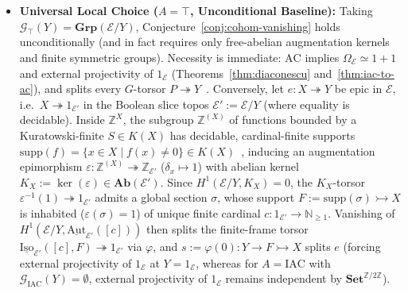 \documentclass[10pt,twoside,openright]{book}
\theoremstyle{crmplain}
\theoremstyle{crmdef}
\theoremstyle{crmremark}
\begin{document}
\begin{itemize}[leftmargin=1.5em]

  \item \textbf{Universal Local Choice ($A = \top$, Unconditional Baseline):} Taking $\mathcal{G}_\top(Y) = \mathbf{Grp}(\mathcal{E}/Y)$, Conjecture~\ref{conj:cohom-vanishing} holds unconditionally (and in fact requires only free-abelian augmentation kernels and finite symmetric groups). Necessity is immediate: $\mathrm{AC}$ implies $\Omega_{\mathcal{E}} \simeq 1+1$ and external projectivity of $1_{\mathcal{E}}$ (Theorems~\ref{thm:diaconescu} and~\ref{thm:iac-to-ac}), and splits every $G$-torsor $P \twoheadrightarrow Y$~\cite{Giraud71}. Conversely, let $e : X \twoheadrightarrow Y$ be epic in $\mathcal{E}$, i.e.\ $X \twoheadrightarrow 1_{\mathcal{E}'}$ in the Boolean slice topos $\mathcal{E}' := \mathcal{E}/Y$ (where equality is decidable). Inside $\mathbb{Z}^X$, the subgroup $\mathbb{Z}^{(X)}$ of functions bounded by a Kuratowski-finite $S \in K(X)$ has decidable, cardinal-finite supports $\mathrm{supp}(f) = \{x \in X \mid f(x) \neq 0\} \in K(X)$~\cite[\S\S D5.2,~D5.4]{Johnstone02}, inducing an augmentation epimorphism $\varepsilon : \mathbb{Z}^{(X)} \twoheadrightarrow \mathbb{Z}_{\mathcal{E}'}$ ($\delta_x \mapsto 1$) with abelian kernel $K_X := \ker(\varepsilon) \in \mathbf{Ab}(\mathcal{E}')$. Since $H^1(\mathcal{E}/Y, K_X) = 0$, the $K_X$-torsor $\varepsilon^{-1}(1) \twoheadrightarrow 1_{\mathcal{E}'}$ admits a global section $\sigma$, whose support $F := \mathrm{supp}(\sigma) \rightarrowtail X$ is inhabited ($\varepsilon(\sigma) = 1$) of unique finite cardinal $c : 1_{\mathcal{E}'} \to \mathbb{N}_{\ge 1}$. Vanishing of $H^1(\mathcal{E}/Y, \underline{\mathrm{Aut}}_{\mathcal{E}'}([c]))$ then splits the finite-frame torsor $\underline{\mathrm{Iso}}_{\mathcal{E}'}([c], F) \twoheadrightarrow 1_{\mathcal{E}'}$ via $\varphi$, and $s := \varphi(0) : Y \to F \rightarrowtail X$ splits $e$ (forcing external projectivity of $1_{\mathcal{E}}$ at $Y = 1_{\mathcal{E}}$, whereas for $A = \mathrm{IAC}$ with $\mathcal{G}_{\mathrm{IAC}}(Y) = \emptyset$, external projectivity of $1_{\mathcal{E}}$ remains independent by $\mathbf{Set}^{\mathbb{Z}/2\mathbb{Z}}$).


\end{itemize}
\end{document}
